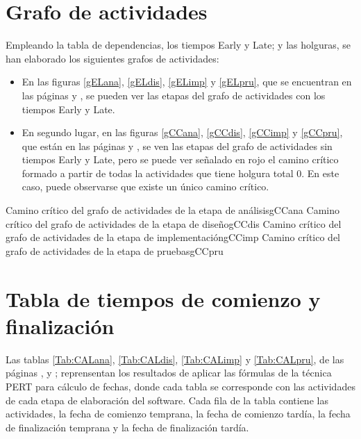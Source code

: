 \documentclass[11pt,a4paper,spanish,twoside]{report}
\begin{document}
\section{Grafo de actividades}
Empleando la tabla de dependencias, los tiempos Early y Late; y las holguras,
se han elaborado los siguientes grafos de actividades:

\begin{itemize}
\item En las figuras \ref{gELana}, \ref{gELdis}, \ref{gELimp} y \ref{gELpru},
  que se encuentran en las páginas \pageref{gELana} y \pageref{gELpru}, se
  pueden ver las etapas del grafo de actividades con los tiempos Early y
  Late.
\item En segundo lugar, en las figuras \ref{gCCana}, \ref{gCCdis},
  \ref{gCCimp} y \ref{gCCpru}, que están en las páginas \pageref{gELana} y
  \pageref{gELpru}, se ven las etapas del grafo de actividades sin tiempos
  Early y Late, pero se puede ver señalado en rojo el camino crítico
  formado a partir de todas la actividades que tiene holgura total 0. En este
  caso, puede observarse que existe un único camino crítico.
\end{itemize}

{Camino crítico del grafo de actividades de la etapa de análisis}{gCCana}
{Camino crítico del grafo de actividades de la etapa de diseño}{gCCdis}
{Camino crítico del grafo de actividades de la etapa de implementación}{gCCimp}
{Camino crítico del grafo de actividades de la etapa de pruebas}{gCCpru}

\section{Tabla de tiempos de comienzo y finalización}
Las tablas \ref{Tab:CALana}, \ref{Tab:CALdis}, \ref{Tab:CALimp} y
\ref{Tab:CALpru}, de las páginas \pageref{Tab:CALana}, \pageref{Tab:CALdis} y
\pageref{Tab:CALpru}; reprensentan los resultados de aplicar las fórmulas de la
técnica PERT para cálculo de fechas, donde cada tabla se corresponde con las
actividades de cada etapa de elaboración del software. Cada fila de la
tabla contiene las actividades, la fecha de comienzo temprana, la fecha
de comienzo tardía, la fecha de finalización temprana y la fecha de
finalización tardía.
\end{document}

